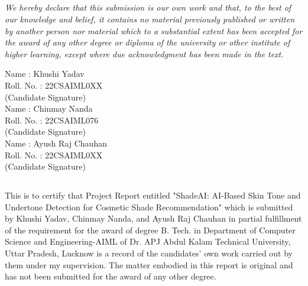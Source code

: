 \begin{center}
\chapter*{}   
\end{center}

\doublespacing
\textit{We hereby declare that this submission is our own work and that, to the best of our knowledge and belief, it contains no material previously published or written by another person nor material which to a substantial extent has been accepted for the award of any other degree or diploma of the university or other institute of higher learning, except where due acknowledgment has been made in the text.}

\begin{flushleft}
Name : Khushi Yadav\\
Roll. No. : 22CSAIML0XX  \\
\vspace{5mm}
(Candidate Signature) \\
\vspace{5mm}
Name : Chinmay Nanda\\
Roll. No. : 22CSAIML076  \\
\vspace{5mm}
(Candidate Signature) \\
\vspace{5mm}
Name : Ayush Raj Chauhan\\
Roll. No. : 22CSAIML0XX  \\
\vspace{5mm}
(Candidate Signature) \\
\vspace{5mm}
\end{flushleft}
\restoregeometry
\newpage
\begin{center}
\chapter*{} 
\end{center}

\doublespacing
This is to certify that Project Report entitled "ShadeAI: AI-Based Skin Tone and Undertone Detection for Cosmetic Shade Recommendation" which is submitted by Khushi Yadav, Chinmay Nanda, and Ayush Raj Chauhan in partial fulfillment of the requirement for the award of degree B. Tech. in Department of Computer Science and Engineering-AIML of Dr. APJ Abdul Kalam Technical University, Uttar Pradesh, Lucknow is a record of the candidates' own work carried out by them under my supervision. The matter embodied in this report is original and has not been submitted for the award of any other degree.

